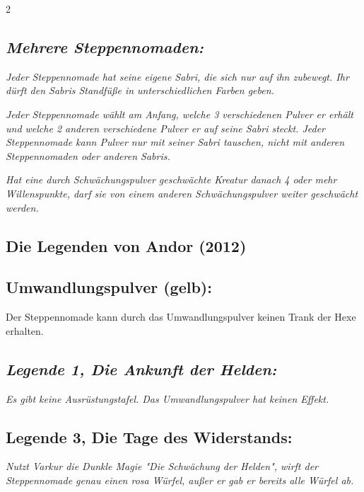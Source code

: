 \documentclass[10pt, a4paper, oneside]{book}
\newcommand{\fan}[1]{\textit{#1}}
\begin{document}
\begin{multicols*}{2}
\begin{nobgcolor}
\subsection{\fan{Mehrere Steppennomaden:}}

\fan{Jeder Steppennomade hat seine eigene Sabri, die sich nur auf ihn zubewegt. Ihr dürft den Sabris Standfüße in unterschiedlichen Farben geben.}

\fan{Jeder Steppennomade wählt am Anfang, welche 3 verschiedenen Pulver er erhält und welche 2 anderen verschiedene Pulver er auf seine Sabri steckt. Jeder Steppennomade kann Pulver nur mit seiner Sabri tauschen, nicht mit anderen Steppennomaden oder anderen Sabris.}

\fan{Hat eine durch Schwächungspulver geschwächte Kreatur danach 4 oder mehr Willenspunkte, darf sie von einem anderen Schwächungspulver weiter geschwächt werden.}


\end{nobgcolor}



\begin{bgcolor}
\section{Die Legenden von Andor (2012)}

\subsection{Umwandlungspulver (gelb):}

Der Steppennomade kann durch das Umwandlungspulver keinen Trank der Hexe erhalten.
\supercite{MH:Pulver}




\subsection{\fan{Legende 1, Die Ankunft der Helden:}}

\fan{Es gibt keine Ausrüstungstafel. Das Umwandlungspulver hat keinen Effekt.}




\subsection{Legende 3, Die Tage des Widerstands:}

\fan{Nutzt Varkur die Dunkle Magie "Die Schwächung der Helden", wirft der Steppennomade genau einen rosa Würfel, außer er gab er bereits alle Würfel ab.}


\end{bgcolor}
\end{multicols*}
\end{document}
